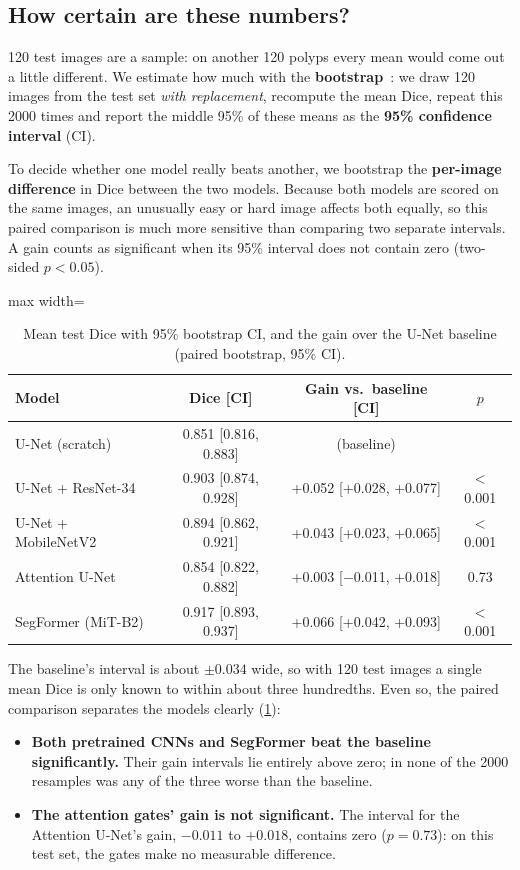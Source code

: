 \subsection{How certain are these numbers?}
\label{sec:ci}
120 test images are a sample: on another 120 polyps every mean would come out a little different. We estimate
how much with the \textbf{bootstrap}~\cite{efron1993bootstrap}: we draw 120 images from the test set \emph{with
replacement}, recompute the mean Dice, repeat this 2000 times and report the middle 95\% of these means as the
\textbf{95\% confidence interval} (CI).

To decide whether one model really beats another, we bootstrap the \textbf{per-image difference} in Dice between
the two models. Because both models are scored on the same images, an unusually easy or hard image affects both
equally, so this paired comparison is much more sensitive than comparing two separate intervals. A gain counts
as significant when its 95\% interval does not contain zero (two-sided $p < 0.05$).

\begin{table}[t]
  \centering
  \footnotesize
  \setlength{\tabcolsep}{2pt}
  \begin{adjustbox}{max width=\linewidth}
  \begin{tabular}{@{}lccc@{}}
    \toprule
    Model & Dice [CI] & Gain vs.\ baseline [CI] & $p$ \\
    \midrule
    U-Net (scratch)     & 0.851 [0.816, 0.883] & (baseline)                  &         \\
    U-Net + ResNet-34   & 0.903 [0.874, 0.928] & +0.052 [+0.028, +0.077]      & $<$0.001 \\
    U-Net + MobileNetV2 & 0.894 [0.862, 0.921] & +0.043 [+0.023, +0.065]      & $<$0.001 \\
    Attention U-Net     & 0.854 [0.822, 0.882] & +0.003 [$-$0.011, +0.018]    & 0.73    \\
    SegFormer (MiT-B2)  & 0.917 [0.893, 0.937] & +0.066 [+0.042, +0.093]      & $<$0.001 \\
    \bottomrule
  \end{tabular}
  \end{adjustbox}
  \caption{Mean test Dice with 95\% bootstrap CI, and the gain over the U-Net baseline (paired bootstrap, 95\% CI).}
  \label{tab:ci}
\end{table}

The baseline's interval is about $\pm0.034$ wide, so with 120 test images a single mean Dice is only known to within
about three hundredths. Even so, the paired comparison separates the models clearly (\cref{tab:ci}):
\begin{itemize}
  \item \textbf{Both pretrained CNNs and SegFormer beat the baseline significantly.} Their gain intervals lie entirely above
        zero; in none of the 2000 resamples was any of the three worse than the baseline.
  \item \textbf{The attention gates' gain is not significant.} The interval for the Attention U-Net's gain, $-0.011$ to
        $+0.018$, contains zero ($p = 0.73$): on this test set, the gates make no measurable difference.
\end{itemize}

